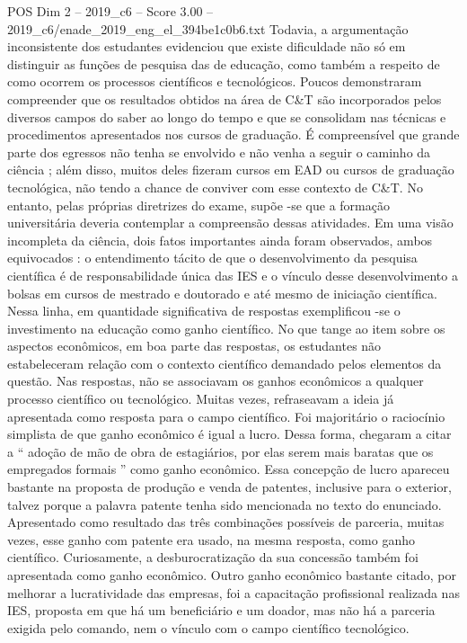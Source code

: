 \begin{textsample}{POS Dim 2 – 2019\_c6 – Score 3.00 – 2019\_c6/enade\_2019\_eng\_el\_394be1c0b6.txt}
Todavia, a argumentação inconsistente dos estudantes evidenciou que existe dificuldade não só em distinguir as funções de pesquisa das de educação, como também a respeito de como ocorrem os processos científicos e tecnológicos.
Poucos demonstraram compreender que os resultados obtidos na área de C\&T são incorporados pelos diversos campos do saber ao longo do tempo e que se consolidam nas técnicas e procedimentos apresentados nos cursos de graduação.
É compreensível que grande parte dos egressos não tenha se envolvido e não venha a seguir o caminho da ciência ; além disso, muitos deles fizeram cursos em EAD ou cursos de graduação tecnológica, não tendo a chance de conviver com esse contexto de C\&T.
No entanto, pelas próprias diretrizes do exame, supõe -se que a formação universitária deveria contemplar a compreensão dessas atividades.
Em uma visão incompleta da ciência, dois fatos importantes ainda foram observados, ambos equivocados : o entendimento tácito de que o desenvolvimento da pesquisa científica é de responsabilidade única das IES e o vínculo desse desenvolvimento a bolsas em cursos de mestrado e doutorado e até mesmo de iniciação científica.
Nessa linha, em quantidade significativa de respostas exemplificou -se o investimento na educação como ganho científico.
No que tange ao item sobre os aspectos econômicos, em boa parte das respostas, os estudantes não estabeleceram relação com o contexto científico demandado pelos elementos da questão.
Nas respostas, não se associavam os ganhos econômicos a qualquer processo científico ou tecnológico.
Muitas vezes, refraseavam a ideia já apresentada como resposta para o campo científico.
Foi majoritário o raciocínio simplista de que ganho econômico é igual a lucro.
Dessa forma, chegaram a citar a “ adoção de mão de obra de estagiários, por elas serem mais baratas que os empregados formais ” como ganho econômico.
Essa concepção de lucro apareceu bastante na proposta de produção e venda de patentes, inclusive para o exterior, talvez porque a palavra patente tenha sido mencionada no texto do enunciado.
Apresentado como resultado das três combinações possíveis de parceria, muitas vezes, esse ganho com patente era usado, na mesma resposta, como ganho científico.
Curiosamente, a desburocratização da sua concessão também foi apresentada como ganho econômico.
Outro ganho econômico bastante citado, por melhorar a lucratividade das empresas, foi a capacitação profissional realizada nas IES, proposta em que há um beneficiário e um doador, mas não há a parceria exigida pelo comando, nem o vínculo com o campo científico tecnológico.

\end{textsample}
